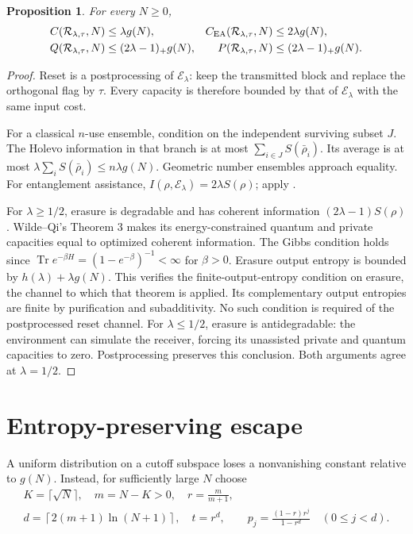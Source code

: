 \documentclass[11pt]{article}
\newtheorem{proposition}[theorem]{Proposition}
\newcommand{\Tr}{\operatorname{Tr}}
\newcommand{\Rcal}{\mathcal R_{\lambda,\tau}}
\newcommand{\Ecal}{\mathcal E_\lambda}
\begin{document}
\begin{proposition}\label{prop:upper}
For every $N\ge0$,
\begin{align}
 C(\Rcal,N)&\le\lambda g(N),&
 C_{\rm EA}(\Rcal,N)&\le2\lambda g(N),\label{eq:upperc}\\
 Q(\Rcal,N)&\le(2\lambda-1)_+g(N),&
 P(\Rcal,N)&\le(2\lambda-1)_+g(N).\label{eq:upperq}
\end{align}
\end{proposition}
\begin{proof}
Reset is a postprocessing of $\Ecal$: keep the transmitted block and
replace the orthogonal flag by $\tau$. Every capacity is therefore
bounded by that of $\Ecal$ with the same input cost.

For a classical $n$-use ensemble, condition on the independent
surviving subset $J$. The Holevo information in that branch is at most
$\sum_{i\in J}S(\bar\rho_i)$. Its average is at most
$\lambda\sum_iS(\bar\rho_i)\le n\lambda g(N)$.
Geometric number ensembles approach equality.
For entanglement assistance,
$I(\rho,\Ecal)=2\lambda S(\rho)$; apply \cite[Theorem 1]{hs}.

For $\lambda\ge1/2$, erasure is degradable and has coherent information
$(2\lambda-1)S(\rho)$. Wilde--Qi's Theorem 3 \cite{wq} makes its
energy-constrained quantum and private capacities equal to optimized
coherent information. The Gibbs condition holds since
$\Tr e^{-\beta H}=(1-e^{-\beta})^{-1}<\infty$ for $\beta>0$.
Erasure output entropy is bounded by $h(\lambda)+\lambda g(N)$.
This verifies the finite-output-entropy condition on erasure, the
channel to which that theorem is applied. Its complementary output
entropies are finite by purification and subadditivity.
No such condition is required of the postprocessed reset channel. For $\lambda\le1/2$, erasure is antidegradable:
the environment can simulate the receiver, forcing its unassisted
private and quantum capacities to zero. Postprocessing preserves this
conclusion. Both arguments agree at $\lambda=1/2$.
\end{proof}

\section{Entropy-preserving escape}
A uniform distribution on a cutoff subspace loses a nonvanishing
constant relative to $g(N)$. Instead, for sufficiently large $N$ choose
\begin{equation}\label{eq:choose}
 \begin{gathered}
 K=\lceil\sqrt N\rceil,\quad m=N-K>0,\quad r=\frac{m}{m+1},\\
 d=\left\lceil2(m+1)\ln(N+1)\right\rceil,\quad t=r^d,\qquad
 p_j=\frac{(1-r)r^j}{1-r^d}\quad(0\le j<d).
 \end{gathered}
\end{equation}
\end{document}

